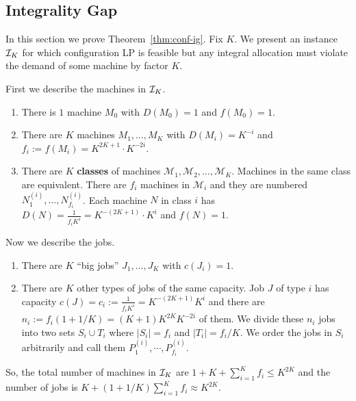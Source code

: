 \subsection{Integrality Gap}\label{sec:conf-ig}
In this section we prove Theorem~\ref{thm:conf-ig}.
	\def\M{\mathcal{M}}
	Fix $K$. We present an instance ${\cal I}_K$ for which configuration LP is feasible but any integral allocation must violate the demand of some machine by factor $K$.
	
	First we describe the machines in ${\cal I}_K$.
	\begin{enumerate}
		\item There is $1$ machine $M_0$ with $D(M_0) = 1$ and $f(M_0) = 1$.
		\item There are $K$ machines $M_1,\ldots,M_K$ with $D(M_i) = K^{-i}$ and $f_i := f(M_i) = K^{2K + 1}\cdot K^{-2i}$.
		\item There are $K$ {\bf classes} of machines $\M_1,\M _2,\ldots, \M _K$. Machines in the same class are equivalent. 
		There are $f_i$ machines in $\M_i$ and they are numbered $N^{(i)}_1,\ldots,N^{(i)}_{f_i}$.
		Each machine $N$  in class $i$ has $D(N) = \frac{1}{f_iK^i} = K^{-(2K+ 1)}\cdot K^i$ and $f(N) = 1$.
	\end{enumerate}
	Now we describe the jobs.
	\begin{enumerate}
		\item There are $K$ ``big jobs'' $J_1,\ldots,J_K$ with $c(J_i) = 1$.
		\item There are $K$ other types of jobs of the same capacity. Job $J$ of type $i$ has capacity $c(J) = c_i :=  \frac{1}{f_iK^i} = K^{-(2K+1)}K^i$  and there are $n_i := f_i (1+1/K) = (K+1)K^{2K}K^{-2i}$ of them.
		We divide these $n_i$ jobs into two sets $S_i \cup T_i$ where $|S_i| = f_i$ and $|T_i| = f_i/K$. We order the jobs in $S_i$ arbitrarily and call them $P^{(i)}_1,\cdots,P^{(i)}_{f_i}$.
	\end{enumerate}
	So, the total number of machines in ${\cal I}_K$ are $1 + K + \sum_{i=1}^K f_i  \leq K^{2K}$ and the number of jobs is $K + (1+1/K)\sum_{i=1}^K f_i \approx K^{2K}$. 
	
